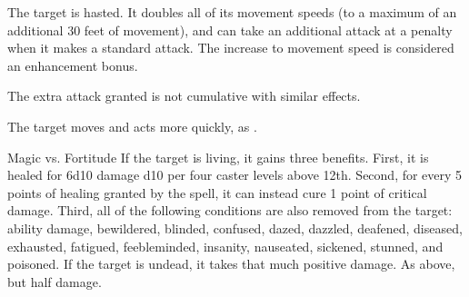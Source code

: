 \begin{spellheader}
    \spelldur{\durshort}
\end{spellheader}
\begin{spelleffects}
    \spelleffect The target is hasted. It doubles all of its movement speeds (to a maximum of an additional 30 feet of movement), and can take an additional attack at a  penalty when it makes a standard attack. The increase to movement speed is considered an enhancement bonus.
\end{spelleffects}
\begin{spellfooter}
    \spellnotes The extra attack granted is not cumulative with similar effects.
\end{spellfooter}

\begin{spellheader}
\end{spellheader}
\begin{spelleffects}
    \spelleffect The target moves and acts more quickly, as .
\end{spelleffects}
\begin{spellfooter}

\end{spellfooter}

\begin{spellheader}
    \spellrng{\rngclose}
\end{spellheader}
\begin{spelleffects}
    \begin{spellattack}{Magic vs. Fortitude}
        \spelleffect If the target is living, it gains three benefits. First, it is healed for 6d10 damage \add d10 per four caster levels above 12th. Second, for every 5 points of healing granted by the spell, it can instead cure 1 point of critical damage. Third, all of the following conditions are also removed from the target: ability damage, bewildered, blinded, confused, dazed, dazzled, deafened, diseased, exhausted, fatigued, feebleminded, insanity, nauseated, sickened, stunned, and poisoned.
        \spellsuccess If the target is undead, it takes that much positive damage.
        \spellfailure As above, but half damage.
    \end{spellattack}
\end{spelleffects}
\begin{spellfooter}

\end{spellfooter}

